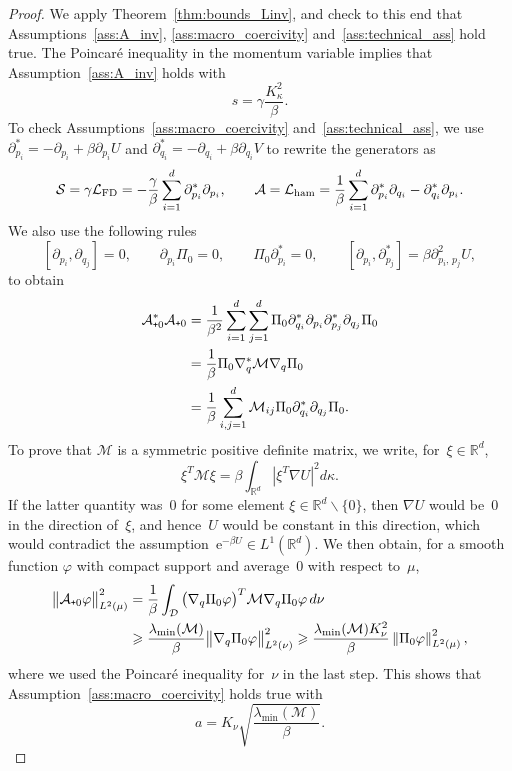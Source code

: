\documentclass[10pt]{amsart}
\theoremstyle{definition}\newtheorem{defi}[theo]{Definition}\newtheorem{rema}[theo]{Remark}\newtheorem{exam}[theo]{Example}\newtheorem{exem}[theo]{Example}\newtheorem{nota}[theo]{Notation}
\newcommand{\rme}{\mathrm{e}}
\newcommand{\cLs}{\mathcal{S}}
\newcommand{\cLa}{\mathcal{A}}
\newcommand{\cD}{\mathcal{D}}
\newcommand{\cLM}{\mathcal{M}}
\newcommand{\R}{\mathbb{R}}
\newcommand{\cLham}{\mathcal{L}_{\rm ham}}
\newcommand{\cLFD}{\mathcal{L}_{\rm FD}}
\newcommand{\subplus}{\textnormal{\texttt{+}}}
\renewcommand{\geq}{\geqslant}
\begin{document}
\begin{proof}
We apply Theorem~\ref{thm:bounds_Linv}, and check to this end that Assumptions~\ref{ass:A_inv}, \ref{ass:macro_coercivity} and~\ref{ass:technical_ass} hold true. The Poincaré inequality in the momentum variable implies that Assumption~\ref{ass:A_inv} holds with
\[
s = \gamma \frac{K_\kappa^2}{\beta}.
\]
To check Assumptions~\ref{ass:macro_coercivity} and~\ref{ass:technical_ass}, we use $\partial_{p_i}^* = -\partial_{p_i} + \beta \partial_{p_i} U$ and $\partial_{q_i}^* = -\partial_{q_i} + \beta \partial_{q_i} V$ to rewrite the generators as
\[
\cLs = \gamma \cLFD = -\frac \gamma \beta \sum_{i=1}^d \partial_{p_i}^* \partial_{p_i},
\qquad \cLa = \cLham = \frac{1}{\beta} \sum_{i=1}^d \partial_{p_i}^* \partial_{q_i} - \partial_{q_i}^* \partial_{p_i}.
\]
We also use the following rules
\[
\left[\partial_{p_{i}}, \partial_{q_{j}}\right] = 0, \qquad \partial_{p_i} \Pi_0 = 0, \qquad \Pi_0 \partial_{p_i}^* = 0, \qquad \left[\partial_{p_i},\partial_{p_j}^*\right] = \beta \partial_{p_i,\,p_j}^2 U,
\]
to obtain
\begin{equation}\label{eq:A^*A_Langevin}
\begin{split}
\cLa_{\subplus 0}^*\cLa_{\subplus 0} &= \frac 1 {\beta^{2}} \sum_{i=1}^{d} \sum_{j=1}^{d} \Pi_{0} \partial_{q_{i}}^{*} \partial_{p_{i}} \partial_{p_{j}}^{*} \partial_{q_{j}} \Pi_{0}\\
 &= \frac1\beta \Pi_{0} \nabla_q^* \cLM \nabla_q \Pi_0 \\
& = \frac1\beta \sum_{i,j=1}^d \cLM_{ij} \Pi_{0} \partial_{q_i}^* \partial_{q_j} \Pi_0.
\end{split}
\end{equation}
To prove that $\cLM$ is a symmetric positive definite matrix, we write, for~$\xi \in \R^d$,
\[
\xi^T \cLM \xi = \beta \int_{\R^d} \left|\xi^T \nabla U\right|^2 d\kappa.
\]
If the latter quantity was~0 for some element $\xi \in \R^d \backslash \{0\}$, then $\nabla U$ would be~0 in the direction of~$\xi$, and hence~$U$ would be constant in this direction, which would contradict the assumption~$\rme^{-\beta U} \in L^1(\R^d)$. We then obtain, for a smooth function $\varphi$ with compact support and average~0 with respect to~$\mu$,
\begin{align*}
\big\|\cLa_{\subplus 0}\varphi\big\|_{L^2(\mu)}^2 & = \frac{1}{\beta}\int_\cD \big(\nabla_q \Pi_0 \varphi\big)^T \cLM \nabla_q \Pi_0 \varphi \, d\nu \\
& \geq \frac{\lambda_{\min}(\cLM)}{\beta} \big\| \nabla_q \Pi_0 \varphi \big\|^2_{L^2(\nu)} \geq \frac{\lambda_{\min}(\cLM) K_\nu^2}{\beta} \left\|\Pi_0 \varphi\right\|_{L^2(\mu)}^2,
\end{align*}
where we used the Poincaré inequality for~$\nu$ in the last step. This shows that Assumption~\ref{ass:macro_coercivity} holds true with
\[
a = K_\nu \sqrt{\frac{\lambda_{\min}(\cLM)}{\beta}}.
\]


\end{proof}
\end{document}
